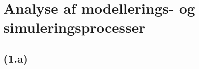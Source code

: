 \documentclass{article}
\author{Mikkel Kragh Mathiesen, Jannik Gram, Rune \& Rasmus Abrahams{\tt (son|en)}}
\title{}
\date{\today}
\begin{document}
\maketitle

\section{Analyse af modellerings- og simuleringsprocesser}
\subsection*{(1.a)}




\end{document}
